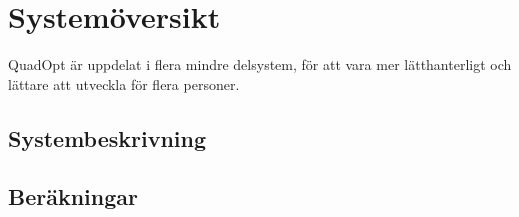 \section{Systemöversikt}
QuadOpt är uppdelat i flera mindre delsystem, för att vara mer lätthanterligt och lättare att utveckla för flera personer.

\subsection{Systembeskrivning}


\subsection{Beräkningar}
